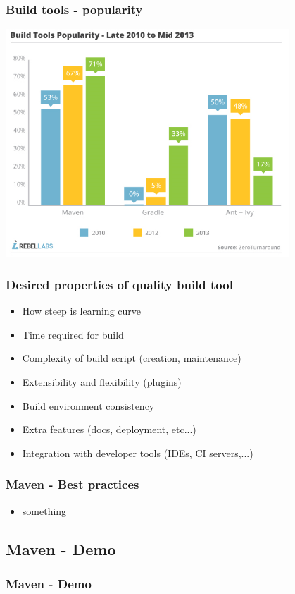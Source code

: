 \begin{frame}
\frametitle{Build tools - popularity}
	\begin{center}
		\includegraphics[width=0.8\textwidth,height=0.64\textwidth]{build-tools-popularity.png}
	\end{center}
\end{frame}

\begin{frame}
\frametitle{Desired properties of quality build tool}
\begin{itemize}
	\item How steep is learning curve
	\item Time required for build
	\item Complexity of build script (creation, maintenance)
	\item Extensibility and flexibility (plugins)
	\item Build environment consistency
	\item Extra features (docs, deployment, etc...)
	\item Integration with developer tools (IDEs, CI servers,...)
\end{itemize}
\end{frame}



\begin{frame}
\frametitle{Maven - Best practices}
\begin{itemize}
\item something
\end{itemize}
\end{frame}




\subsection[]{Maven - Demo}
\begin{frame}
\frametitle{Maven - Demo}
\end{frame}








